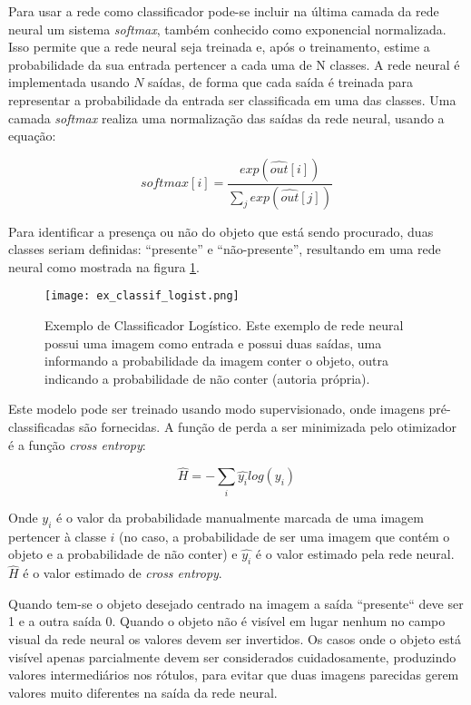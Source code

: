 Para usar a rede como classificador pode-se incluir na última camada da rede
neural um sistema \emph{softmax}, também conhecido como exponencial
normalizada. Isso
permite que a rede neural seja treinada e, após o treinamento, estime a
probabilidade da sua entrada pertencer a cada uma de N classes. A rede neural é
implementada usando $N$ saídas, de forma que cada saída é treinada para
representar a probabilidade da entrada ser classificada em uma das classes.
Uma camada \emph{softmax} realiza uma normalização das saídas da rede neural,
usando a equação:

\begin{equation}
	softmax[i] = \frac
		{exp\left( \widehat{out}[i] \right)}
		{\sum_j exp\left( \widehat{out}[j] \right)}
\end{equation}

Para identificar a presença ou não do objeto que está sendo procurado, duas
classes seriam definidas: ``presente'' e ``não-presente'', resultando em uma rede
neural como mostrada na figura \ref{fig:ex_classif_logist}.

\begin{figure}[!htb]
	\centering
	\texttt{[image: ex\_classif\_logist.png]}
	\caption[Exemplo de Classificador Logístico]{
		Exemplo de Classificador Logístico.
		Este exemplo de rede neural possui uma imagem como entrada e possui duas
		saídas, uma informando a probabilidade da imagem conter o objeto, outra
		indicando a probabilidade de não conter (autoria própria).}
	\label{fig:ex_classif_logist}
\end{figure}

Este modelo pode ser treinado usando modo supervisionado, onde imagens
pré-classificadas são fornecidas. A função de perda a ser minimizada pelo
otimizador é a função \emph{cross entropy}:

\begin{equation}
	\widehat{H} = - \sum_i \widehat{y_i} log(y_i)
\end{equation}

Onde $y_i$ é o valor da probabilidade manualmente
marcada de uma imagem pertencer à classe $i$ (no caso, a probabilidade de ser
uma imagem que contém o objeto e a probabilidade de não conter) e $\widehat{y_i}$
é o valor estimado pela rede neural. $\widehat{H}$ é o valor estimado de
\emph{cross entropy}.

Quando tem-se o objeto desejado centrado na imagem a saída ``presente`` deve
ser 1 e a outra saída 0. Quando o objeto não é visível em lugar nenhum no campo
visual da rede neural os valores devem ser invertidos.
Os casos onde o objeto está visível apenas parcialmente devem ser considerados
cuidadosamente, produzindo valores intermediários nos rótulos, para evitar que
duas imagens parecidas gerem valores muito diferentes na saída da rede neural.

